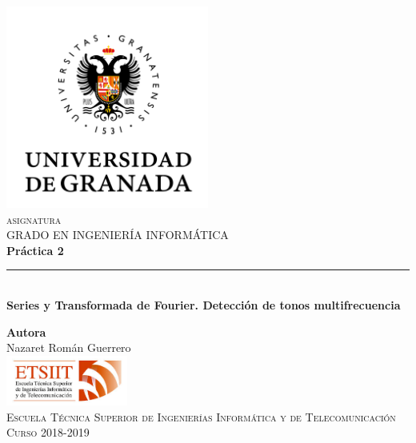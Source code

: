 \documentclass[11pt,a4paper]{article}
\begin{document}
\begin{titlepage}

\begin{minipage}{\textwidth}

\centering
\includegraphics[width=0.5\textwidth]{img/logo.png}\\

\textsc{\Large asignatura\\[0.2cm]}
\textsc{GRADO EN INGENIERÍA INFORMÁTICA}\\[1cm]

{\Huge\bfseries Práctica 2\\}
\noindent\rule[-1ex]{\textwidth}{3pt}\\[3.5ex]
{\large\bfseries Series y Transformada de Fourier. Detección de tonos multifrecuencia}
\end{minipage}

\vspace{1.5cm}
\begin{minipage}{\textwidth}
\centering

\textbf{Autora}\\ {Nazaret Román Guerrero}\\[2.5ex]
\includegraphics[width=0.3\textwidth]{img/etsiit.jpeg}\\[0.1cm]
\vspace{1cm}
\textsc{Escuela Técnica Superior de Ingenierías Informática y de Telecomunicación}\\
\vspace{1cm}
\textsc{Curso 2018-2019}
\end{minipage}
\end{titlepage}

\tableofcontents
\thispagestyle{empty}
\end{document}
